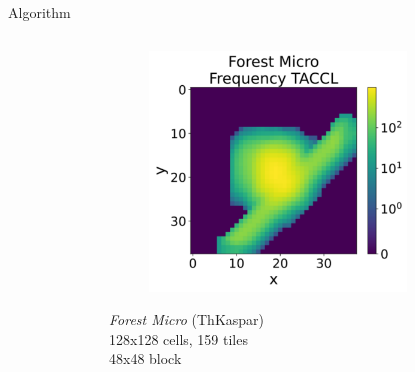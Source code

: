 \documentclass{beamer}
\begin{document}
  \begin{frame}[fragile]{Algorithm}
    \begin{columns}[T,onlytextwidth]
        \begin{block}{}
          \begin{figure}
          \end{figure}
        \end{block}
        \begin{block}{}
          \begin{figure}
            \includegraphics[width=0.8\textwidth]{img/forestmicro_freq_accl.pdf}
          \end{figure}
          \begin{centering}
          \textit{Forest Micro} (ThKaspar) \\
          128x128 cells, 159 tiles \\
          48x48 block \\
          \end{centering}
        \end{block}
    \end{columns}
  \end{frame}

%
\end{document}
